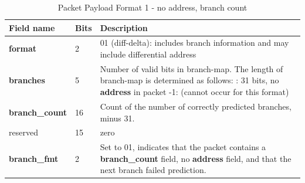 \begin{table}[htp]
  \centering
  \caption{Packet Payload Format 1 - no address, branch count}
  \label{tab:te_inst0-1-noaddr-count}
  \begin{tabulary}{\textwidth}{|l|p{35mm}|p{80mm}|}
    \hline
    {\bf Field name} & {\bf Bits} & {\bf Description} \\
    \hline
    \textbf{format}	& 2	& 01 (diff-delta): includes branch information and may include differential address\\
    \hline
    \textbf{branches} & 5 & Number of valid bits in branch-map. The length of branch-map is determined as follows: :      31 bits, no \textbf{address} in packet -1: 	(cannot occur for this format) \\
    \hline
    \textbf{branch\_count} & 16 & Count of the number of correctly predicted branches, minus 31. \\
    \hline
    reserved & 15 & zero\\
    \hline
    \textbf{branch\_fmt} & 2 & Set to 01, indicates that the packet contains a \textbf{branch\_count} field, no
    \textbf{address} field, and that the next branch failed prediction. \\
    \hline
  \end{tabulary}
\end{table}

